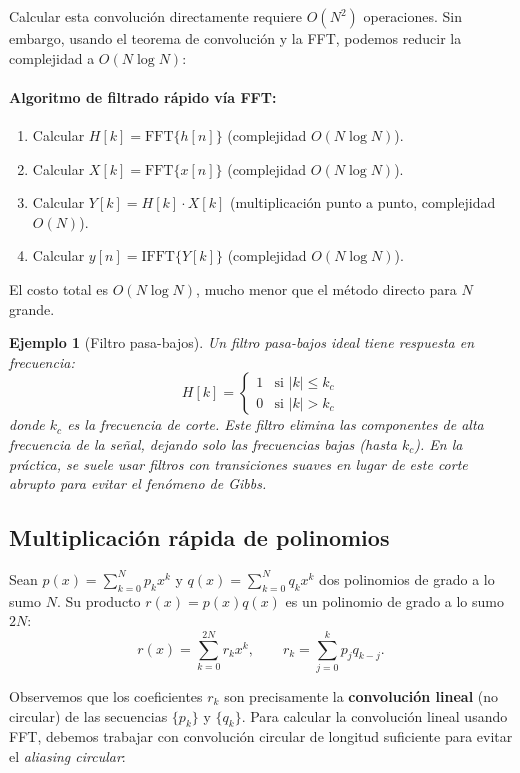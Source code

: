 \documentclass[a4paper,11pt]{report}
\newtheorem{example}[theorem]{Ejemplo}
\begin{document}
Calcular esta convolución directamente requiere $O(N^2)$ operaciones. Sin embargo, usando el teorema de convolución y la FFT, podemos reducir la complejidad a $O(N \log N)$:

\paragraph{Algoritmo de filtrado rápido vía FFT:}
\begin{enumerate}
\item Calcular $H[k] = \text{FFT}\{h[n]\}$ (complejidad $O(N \log N)$).
\item Calcular $X[k] = \text{FFT}\{x[n]\}$ (complejidad $O(N \log N)$).
\item Calcular $Y[k] = H[k] \cdot X[k]$ (multiplicación punto a punto, complejidad $O(N)$).
\item Calcular $y[n] = \text{IFFT}\{Y[k]\}$ (complejidad $O(N \log N)$).
\end{enumerate}

El costo total es $O(N \log N)$, mucho menor que el método directo para $N$ grande.

\begin{example}[Filtro pasa-bajos]
Un filtro pasa-bajos ideal tiene respuesta en frecuencia:
\[
H[k] = 
\begin{cases}
1 & \text{si } |k| \leq k_c \\
0 & \text{si } |k| > k_c
\end{cases}
\]
donde $k_c$ es la \emph{frecuencia de corte}. Este filtro elimina las componentes de alta frecuencia de la señal, dejando solo las frecuencias bajas (hasta $k_c$). En la práctica, se suele usar filtros con transiciones suaves en lugar de este corte abrupto para evitar el fenómeno de Gibbs.
\end{example}

\subsection{Multiplicación rápida de polinomios}

Sean $p(x) = \sum_{k=0}^{N} p_k x^k$ y $q(x) = \sum_{k=0}^{N} q_k x^k$ dos polinomios de grado a lo sumo $N$. Su producto $r(x) = p(x) q(x)$ es un polinomio de grado a lo sumo $2N$:
\[
r(x) = \sum_{k=0}^{2N} r_k x^k, \qquad r_k = \sum_{j=0}^{k} p_j q_{k-j}.
\]

Observemos que los coeficientes $r_k$ son precisamente la \textbf{convolución lineal} (no circular) de las secuencias $\{p_k\}$ y $\{q_k\}$. Para calcular la convolución lineal usando FFT, debemos trabajar con convolución circular de longitud suficiente para evitar el \emph{aliasing circular}:
\end{document}
